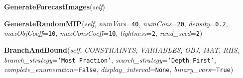     \label{coinor:grumpy:BB:BBTree:GenerateForecastImages}

    \vspace{0.5ex}

\hspace{.8\funcindent}\begin{boxedminipage}{\funcwidth}

    \raggedright \textbf{GenerateForecastImages}(\textit{self})

\setlength{\parskip}{2ex}
\setlength{\parskip}{1ex}
    \end{boxedminipage}

    \label{coinor:grumpy:BB:BBTree:GenerateRandomMIP}

    \vspace{0.5ex}

\hspace{.8\funcindent}\begin{boxedminipage}{\funcwidth}

    \raggedright \textbf{GenerateRandomMIP}(\textit{self}, \textit{numVars}={\tt 40}, \textit{numCons}={\tt 20}, \textit{density}={\tt 0.2}, \textit{maxObjCoeff}={\tt 10}, \textit{maxConsCoeff}={\tt 10}, \textit{tightness}={\tt 2}, \textit{rand\_seed}={\tt 2})

\setlength{\parskip}{2ex}
\setlength{\parskip}{1ex}
    \end{boxedminipage}

    \label{coinor:grumpy:BB:BBTree:BranchAndBound}

    \vspace{0.5ex}

\hspace{.8\funcindent}\begin{boxedminipage}{\funcwidth}

    \raggedright \textbf{BranchAndBound}(\textit{self}, \textit{CONSTRAINTS}, \textit{VARIABLES}, \textit{OBJ}, \textit{MAT}, \textit{RHS}, \textit{branch\_strategy}={\tt \texttt{'}\texttt{Most Fraction}\texttt{'}}, \textit{search\_strategy}={\tt \texttt{'}\texttt{Depth First}\texttt{'}}, \textit{complete\_enumeration}={\tt False}, \textit{display\_interval}={\tt None}, \textit{binary\_vars}={\tt True})

\setlength{\parskip}{2ex}
\setlength{\parskip}{1ex}
    \end{boxedminipage}



